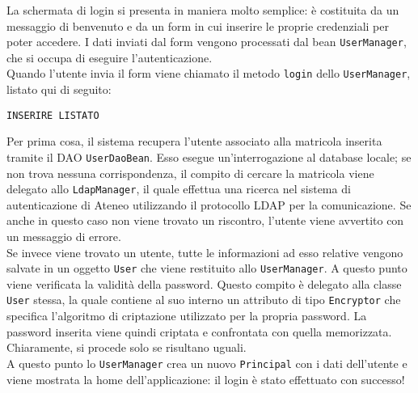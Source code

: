 

La schermata di login si presenta in maniera molto semplice: è costituita da un messaggio di benvenuto e da un form in cui inserire le proprie credenziali per poter accedere. I dati inviati dal form vengono processati dal bean \lstinline{UserManager}, che si occupa di eseguire l'autenticazione.\\
Quando l'utente invia il form viene chiamato il metodo \lstinline{login} dello \lstinline{UserManager}, listato qui di seguito:

\begin{lstlisting}
INSERIRE LISTATO
\end{lstlisting}

Per prima cosa, il sistema recupera l'utente associato alla matricola inserita tramite il DAO \lstinline{UserDaoBean}. Esso esegue un'interrogazione al database locale; se non trova nessuna corrispondenza, il compito di cercare la matricola viene delegato  allo \lstinline{LdapManager}, il quale effettua una ricerca nel sistema di autenticazione di Ateneo utilizzando il protocollo LDAP per la comunicazione. Se anche in questo caso non viene trovato un riscontro, l'utente viene avvertito con un messaggio di errore.\\
Se invece viene trovato un utente, tutte le informazioni ad esso relative vengono salvate in un oggetto \lstinline{User} che viene restituito allo \lstinline{UserManager}. A questo punto viene verificata la validità della password. Questo compito è delegato alla classe \lstinline{User} stessa, la quale contiene al suo interno un attributo di tipo \lstinline{Encryptor} che specifica l'algoritmo di criptazione utilizzato per la propria password. La password inserita viene quindi criptata e confrontata con quella memorizzata. Chiaramente, si procede solo se risultano uguali.\\
A questo punto lo \lstinline{UserManager} crea un nuovo \lstinline{Principal} con i dati dell'utente e viene mostrata la home dell'applicazione: il login è stato effettuato con successo!